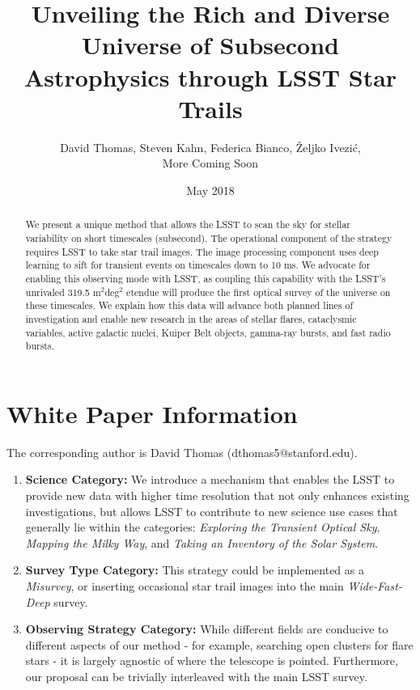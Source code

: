 \documentclass[12pt, letterpaper]{article}
\title{Unveiling the Rich and Diverse Universe of Subsecond Astrophysics through LSST Star Trails}
\author{David Thomas, Steven Kahn, Federica Bianco, Željko Ivezić, \\{\color{green}More Coming Soon}}
\date{May 2018}
\begin{document}
\maketitle

\begin{abstract}
We present a unique method that allows the LSST to scan the sky for stellar variability on short timescales (subsecond).
The operational component of the strategy requires LSST to take star trail images. The image processing component uses deep learning to sift for transient events on timescales down to 10 ms. We advocate for enabling this observing mode with LSST, as coupling this capability with the LSST's unrivaled 319.5 m$^2$deg$^2$ etendue will produce the first optical survey of the universe on these timescales. We explain how this data will advance both planned lines of investigation and enable new research in the areas of stellar flares, cataclysmic variables, active galactic nuclei, Kuiper Belt objects, gamma-ray bursts, and fast radio bursts.
\end{abstract}

\section{White Paper Information}
The corresponding author is David Thomas (dthomas5@stanford.edu).

\begin{enumerate} 
\item {\bf Science Category:} We introduce a mechanism that enables the LSST to provide new data with higher time resolution that not only enhances existing investigations, but allows LSST to contribute to new science use cases that generally lie within the categories: \textit{Exploring the Transient Optical Sky}, \textit{Mapping the Milky Way}, and \textit{Taking an Inventory of the Solar System}.

\item {\bf Survey Type Category:} This strategy could be implemented as a \emph{Misurvey}, or inserting occasional star trail images into the main \textit{Wide-Fast-Deep} survey.

\item {\bf Observing Strategy Category:}
While different fields are conducive to different aspects of our method - for example, searching open clusters for flare stars - it is largely agnostic of where the telescope is pointed. Furthermore, our proposal can be trivially interleaved with the main LSST survey.

\end{enumerate}  
\end{document}
